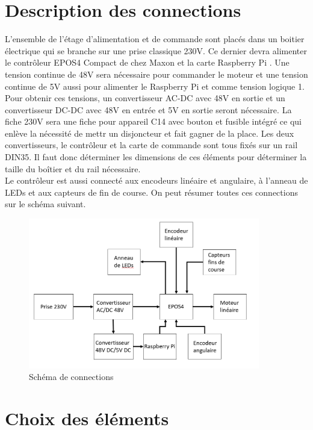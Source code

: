 \section{Description des connections}\label{sec:DescConnect}
L'ensemble de l'étage d'alimentation et de commande sont placés dans un boitier électrique qui se branche sur une prise classique 230V. Ce dernier
devra alimenter le contrôleur EPOS4 Compact de chez Maxon \cite{Maxon} et la carte Raspberry Pi \cite{RaspberryPi}. Une tension continue de 48V
sera nécessaire pour commander le moteur et une tension continue de 5V aussi pour alimenter le Raspberry Pi et comme tension logique 1. Pour obtenir
ces tensions, un convertisseur AC-DC avec 48V en sortie et un convertisseur DC-DC avec 48V en entrée et 5V en sortie seront nécessaire. La fiche 230V
sera une fiche pour appareil C14 avec bouton et fusible intégré ce qui enlève la nécessité de mettr un disjoncteur et fait gagner de la place. Les deux
convertisseurs, le contrôleur et la carte de commande sont tous fixés sur un rail DIN35. Il faut donc déterminer les dimensions de ces éléments pour
déterminer la taille du boîtier et du rail nécessaire.\\

Le contrôleur est aussi connecté aux encodeurs linéaire et angulaire, à l'anneau de LEDs et aux capteurs de fin de course. On peut résumer toutes
ces connections sur le schéma suivant.

\begin{figure}[H]
    \centering
    \includegraphics[width = 0.9\textwidth]{assets/figures/SchemaLogique.png}
    \caption{Schéma de connections}
    \label{fig:SchemaConnec}
\end{figure}

\section{Choix des éléments}\label{sec:ChoixElem}

